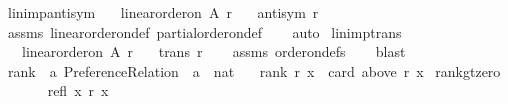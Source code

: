 \begin{isabellebody}
\isanewline
{}\isamarkupfalse%
\ lin{\isacharunderscore}{\kern0pt}imp{\isacharunderscore}{\kern0pt}antisym{\isacharcolon}{\kern0pt}\isanewline
\ \ \ {\isachardoublequoteopen}linear{\isacharunderscore}{\kern0pt}order{\isacharunderscore}{\kern0pt}on\ A\ r{\isachardoublequoteclose}\isanewline
\ \ \ {\isachardoublequoteopen}antisym\ r{\isachardoublequoteclose}\isanewline
%
\isadelimproof
\ \ %
\endisadelimproof
%
\isatagproof
{}\isamarkupfalse%
\ assms\ linear{\isacharunderscore}{\kern0pt}order{\isacharunderscore}{\kern0pt}on{\isacharunderscore}{\kern0pt}def\ partial{\isacharunderscore}{\kern0pt}order{\isacharunderscore}{\kern0pt}on{\isacharunderscore}{\kern0pt}def\isanewline
\ \ \isamarkupfalse%
\ auto%
\endisatagproof
{\isafoldproof}%
%
\isadelimproof
\isanewline
%
\endisadelimproof
\isanewline
{}\isamarkupfalse%
\ lin{\isacharunderscore}{\kern0pt}imp{\isacharunderscore}{\kern0pt}trans{\isacharcolon}{\kern0pt}\isanewline
\ \ \ {\isachardoublequoteopen}linear{\isacharunderscore}{\kern0pt}order{\isacharunderscore}{\kern0pt}on\ A\ r{\isachardoublequoteclose}\isanewline
\ \ \ {\isachardoublequoteopen}trans\ r{\isachardoublequoteclose}\isanewline
%
\isadelimproof
\ \ %
\endisadelimproof
%
\isatagproof
{}\isamarkupfalse%
\ assms\ order{\isacharunderscore}{\kern0pt}on{\isacharunderscore}{\kern0pt}defs\isanewline
\ \ \isamarkupfalse%
\ blast%
\endisatagproof
{\isafoldproof}%
%
\isadelimproof
%
\endisadelimproof
%
\isadelimdocument
%
\endisadelimdocument
%
\isatagdocument
%
\isamarkuptrue%
%
\endisatagdocument
{\isafolddocument}%
%
\isadelimdocument
%
\endisadelimdocument
{}\isamarkupfalse%
\ rank\ {\isacharcolon}{\kern0pt}{\isacharcolon}{\kern0pt}\ {\isachardoublequoteopen}{\isacharprime}{\kern0pt}a\ Preference{\isacharunderscore}{\kern0pt}Relation\ {\isasymRightarrow}\ {\isacharprime}{\kern0pt}a\ {\isasymRightarrow}\ nat{\isachardoublequoteclose}\ \isanewline
\ \ {\isachardoublequoteopen}rank\ r\ x\ {\isacharequal}{\kern0pt}\ card\ {\isacharparenleft}{\kern0pt}above\ r\ x{\isacharparenright}{\kern0pt}{\isachardoublequoteclose}\isanewline
\isanewline
{}\isamarkupfalse%
\ rank{\isacharunderscore}{\kern0pt}gt{\isacharunderscore}{\kern0pt}zero{\isacharcolon}{\kern0pt}\isanewline
\ \ \isanewline
\ \ \ \ refl{\isacharcolon}{\kern0pt}\ {\isachardoublequoteopen}x\ {\isasympreceq}\isactrlsub r\ x{\isachardoublequoteclose}\ \isanewline

\end{isabellebody}
